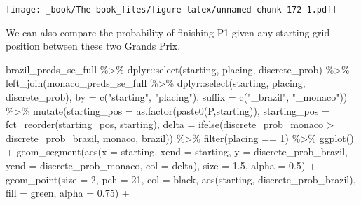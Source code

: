 \documentclass[
]{book}
\newenvironment{Shaded}{\begin{snugshade}}{\end{snugshade}}
\newcommand{\AttributeTok}[1]{\textcolor[rgb]{0.77,0.63,0.00}{#1}}
\newcommand{\DecValTok}[1]{\textcolor[rgb]{0.00,0.00,0.81}{#1}}
\newcommand{\FloatTok}[1]{\textcolor[rgb]{0.00,0.00,0.81}{#1}}
\newcommand{\FunctionTok}[1]{\textcolor[rgb]{0.00,0.00,0.00}{#1}}
\newcommand{\NormalTok}[1]{#1}
\newcommand{\SpecialCharTok}[1]{\textcolor[rgb]{0.00,0.00,0.00}{#1}}
\newcommand{\StringTok}[1]{\textcolor[rgb]{0.31,0.60,0.02}{#1}}
\begin{document}
\texttt{[image: \_book/The-book\_files/figure-latex/unnamed-chunk-172-1.pdf]}

We can also compare the probability of finishing P1 given any starting grid position between these two Grands Prix.

\begin{Shaded}
\begin{Highlighting}[]
\NormalTok{brazil\_preds\_se\_full }\SpecialCharTok{\%\textgreater{}\%}
\NormalTok{  dplyr}\SpecialCharTok{::}\FunctionTok{select}\NormalTok{(starting, placing, discrete\_prob) }\SpecialCharTok{\%\textgreater{}\%}
  \FunctionTok{left\_join}\NormalTok{(monaco\_preds\_se\_full }\SpecialCharTok{\%\textgreater{}\%}
\NormalTok{  dplyr}\SpecialCharTok{::}\FunctionTok{select}\NormalTok{(starting, placing, discrete\_prob), }\AttributeTok{by =} \FunctionTok{c}\NormalTok{(}\StringTok{"starting"}\NormalTok{, }\StringTok{"placing"}\NormalTok{), }\AttributeTok{suffix =} \FunctionTok{c}\NormalTok{(}\StringTok{"\_brazil"}\NormalTok{, }\StringTok{"\_monaco"}\NormalTok{)) }\SpecialCharTok{\%\textgreater{}\%}
  \FunctionTok{mutate}\NormalTok{(}\AttributeTok{starting\_pos =} \FunctionTok{as.factor}\NormalTok{(}\FunctionTok{paste0}\NormalTok{(}\StringTok{\textquotesingle{}P\textquotesingle{}}\NormalTok{,starting)),}
         \AttributeTok{starting\_pos =} \FunctionTok{fct\_reorder}\NormalTok{(starting\_pos, starting),}
         \AttributeTok{delta =} \FunctionTok{ifelse}\NormalTok{(discrete\_prob\_monaco }\SpecialCharTok{\textgreater{}}\NormalTok{ discrete\_prob\_brazil, }\StringTok{\textquotesingle{}monaco\textquotesingle{}}\NormalTok{, }\StringTok{\textquotesingle{}brazil\textquotesingle{}}\NormalTok{)) }\SpecialCharTok{\%\textgreater{}\%}
  \FunctionTok{filter}\NormalTok{(placing }\SpecialCharTok{==} \DecValTok{1}\NormalTok{) }\SpecialCharTok{\%\textgreater{}\%}
  \FunctionTok{ggplot}\NormalTok{() }\SpecialCharTok{+}
  \FunctionTok{geom\_segment}\NormalTok{(}\FunctionTok{aes}\NormalTok{(}\AttributeTok{x =}\NormalTok{ starting, }\AttributeTok{xend =}\NormalTok{ starting, }\AttributeTok{y =}\NormalTok{ discrete\_prob\_brazil, }\AttributeTok{yend =}\NormalTok{ discrete\_prob\_monaco, }\AttributeTok{col =}\NormalTok{ delta),}
               \AttributeTok{size =} \FloatTok{1.5}\NormalTok{, }\AttributeTok{alpha =} \FloatTok{0.5}\NormalTok{) }\SpecialCharTok{+}
  \FunctionTok{geom\_point}\NormalTok{(}\AttributeTok{size =} \DecValTok{2}\NormalTok{, }\AttributeTok{pch =} \DecValTok{21}\NormalTok{, }\AttributeTok{col =} \StringTok{\textquotesingle{}black\textquotesingle{}}\NormalTok{, }\FunctionTok{aes}\NormalTok{(starting, discrete\_prob\_brazil), }\AttributeTok{fill =} \StringTok{\textquotesingle{}green\textquotesingle{}}\NormalTok{, }\AttributeTok{alpha =} \FloatTok{0.75}\NormalTok{) }\SpecialCharTok{+}

\end{Highlighting}
\end{Shaded}
\end{document}
